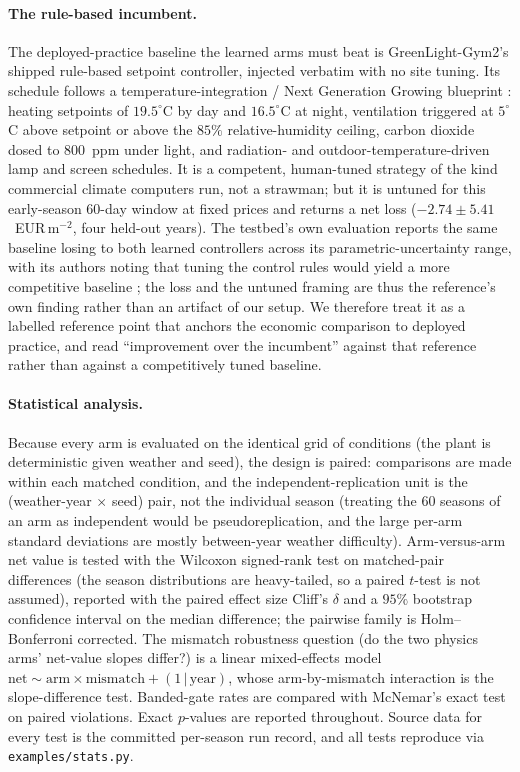 \documentclass[11pt]{article}
\begin{document}
\paragraph{The rule-based incumbent.} The deployed-practice baseline the learned
arms must beat is GreenLight-Gym2's shipped rule-based setpoint controller,
injected verbatim with no site tuning. Its schedule follows a
temperature-integration / Next Generation Growing blueprint
\citep{koerner2003tempintegration, degelder2012ngg}: heating setpoints of
$19.5^\circ$C by day and $16.5^\circ$C at night, ventilation triggered at
$5^\circ$C above setpoint or above the $85\%$ relative-humidity ceiling, carbon
dioxide dosed to $800$~ppm under light, and radiation- and
outdoor-temperature-driven lamp and screen schedules. It is a competent,
human-tuned strategy of the kind commercial climate computers run, not a
strawman; but it is untuned for this early-season 60-day window at fixed prices
and returns a net loss ($-2.74 \pm 5.41$~EUR\,m$^{-2}$, four held-out years). The
testbed's own evaluation reports the same baseline losing to both learned
controllers across its parametric-uncertainty range, with its authors noting that
tuning the control rules would yield a more competitive baseline
\citep{vanlaatum2024greenlight}; the loss and the untuned framing are thus the
reference's own finding rather than an artifact of our setup. We therefore treat
it as a labelled reference point that anchors the economic comparison to deployed
practice, and read ``improvement over the incumbent'' against that reference
rather than against a competitively tuned baseline.

\paragraph{Statistical analysis.} Because every arm is evaluated on the identical grid
of conditions (the plant is deterministic given weather and seed), the design is paired:
comparisons are made within each matched condition, and the independent-replication unit
is the (weather-year $\times$ seed) pair, not the individual season (treating the 60
seasons of an arm as independent would be pseudoreplication, and the large per-arm
standard deviations are mostly between-year weather difficulty). Arm-versus-arm net value
is tested with the Wilcoxon signed-rank test on matched-pair differences (the season
distributions are heavy-tailed, so a paired $t$-test is not assumed), reported with the
paired effect size Cliff's $\delta$ and a $95\%$ bootstrap confidence interval on the
median difference; the pairwise family is Holm--Bonferroni corrected. The mismatch
robustness question (do the two physics arms' net-value slopes differ?) is a linear
mixed-effects model $\text{net} \sim \text{arm} \times \text{mismatch} + (1\,|\,\text{year})$,
whose arm-by-mismatch interaction is the slope-difference test. Banded-gate rates are
compared with McNemar's exact test on paired violations. Exact $p$-values are reported
throughout. Source data for every test is the committed per-season run record, and all
tests reproduce via \texttt{examples/stats.py}.
\end{document}
